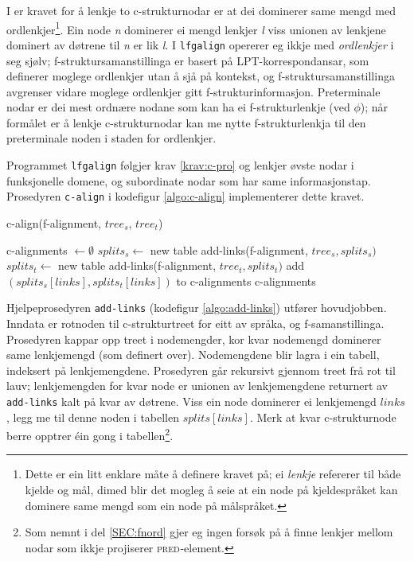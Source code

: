 \documentclass[12pt,a4paper,oneside,draft]{report}
\newcommand{\F}[2]{\textsc{#1}\ensuremath{_{#2}}}
\newcommand{\PRED}{\F{pred}{}}
\begin{document}
I \citet[s.~77]{dyvik2009lmp} er kravet for å lenkje to
c-strukturnodar er at dei dominerer same mengd med
ordlenkjer\footnote{Dette er ein litt enklare måte å definere kravet på; ei
        \emph{lenkje} refererer til både kjelde og mål, dimed blir det
        mogleg å seie at ein node på kjeldespråket kan dominere same
        mengd som ein node på målspråket. }. Ein node \emph{n} dominerer ei mengd lenkjer \emph{l} viss
unionen av lenkjene dominert av døtrene til \emph{n} er lik \emph{l}. I
\texttt{lfgalign} opererer eg ikkje med \emph{ordlenkjer} i seg sjølv;
f-struktursamanstillinga er basert på LPT-korrespondansar, som
definerer moglege ordlenkjer utan å sjå på kontekst, og
f-struktursamanstillinga avgrenser vidare moglege ordlenkjer gitt
f-strukturinformasjon. Preterminale nodar er dei mest ordnære nodane
som kan ha ei f-strukturlenkje (ved $\phi$); når formålet er å lenkje
c-strukturnodar kan me nytte f-strukturlenkja til den preterminale
noden i staden for ordlenkjer.

Programmet \texttt{lfgalign} følgjer krav \ref{krav:c-pro} og
lenkjer øvste nodar i funksjonelle domene, og subordinate nodar som
har same informasjonstap. Prosedyren \texttt{c-align} i kodefigur
\ref{algo:c-align} implementerer dette kravet. 

 \begin{algorithm}[]
   \caption{c-align(f-alignment, $tree_s$, $tree_t$)}
   \label{algo:c-align}
    
   c-alignments $\gets \emptyset$ \;
   $splits_s \gets$ new table \;
   add-links(f-alignment, $tree_s, splits_s)$  \;
   $splits_t \gets$ new table \;
   add-links(f-alignment, $tree_t, splits_t)$  \;
    {
        {
             add $(splits_s[links],splits_t[links])$ to c-alignments \;
        }
    }
    \Return c-alignments \;
    \end{algorithm}    

Hjelpeprosedyren \texttt{add-links} (kodefigur \ref{algo:add-links}) utfører
 hovudjobben. Inndata er rotnoden til c-strukturtreet for eitt av
 språka, og f-samanstillinga. Prosedyren kappar opp treet i
 nodemengder, kor kvar nodemengd dominerer same lenkjemengd (som
 definert over).  Nodemengdene blir lagra i ein tabell, indeksert på
 lenkjemengdene. Prosedyren går rekursivt gjennom treet frå rot til
 lauv; lenkjemengden for kvar node er unionen av lenkjemengdene
 returnert av \texttt{add-links} kalt på kvar av døtrene. Viss ein node
 dominerer ei lenkjemengd $links$, legg me til denne noden i tabellen
 $splits[links]$. Merk at kvar c-strukturnode berre opptrer éin gong i
 tabellen\footnote{Som nemnt i del \ref{SEC:fnord} gjer eg ingen forsøk på å
        finne lenkjer mellom nodar som ikkje projiserer
        \PRED{}-element. }.
\end{document}
